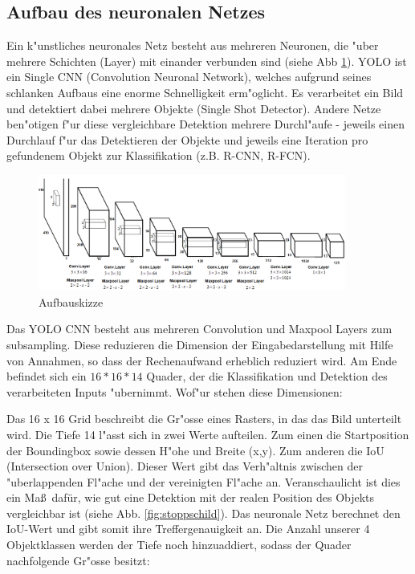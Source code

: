 \subsection{Aufbau des neuronalen Netzes}
\label{sec:cnn_aufbau}
Ein k"unstliches neuronales Netz besteht aus mehreren Neuronen, die "uber mehrere Schichten (Layer) mit einander verbunden sind (siehe Abb \ref{fig:neunet}). YOLO ist ein Single CNN (Convolution Neuronal Network),
welches aufgrund seines schlanken Aufbaus eine enorme Schnelligkeit erm"oglicht. Es verarbeitet ein Bild und detektiert dabei mehrere Objekte (Single Shot Detector). Andere Netze ben"otigen f"ur diese vergleichbare Detektion mehrere Durchl"aufe - jeweils einen Durchlauf f"ur das Detektieren der Objekte und jeweils eine Iteration pro gefundenem Objekt zur Klassifikation (z.B. R-CNN, R-FCN).

\begin{figure}[h]
	\centering
	\includegraphics[width=0.90\textwidth]{images/aufbauskizze}
	\caption{Aufbauskizze}
	\label{fig:neunet}
\end{figure}

Das YOLO CNN besteht aus mehreren Convolution und Maxpool Layers zum subsampling.
Diese reduzieren die Dimension der Eingabedarstellung mit Hilfe von Annahmen,
so dass der Rechenaufwand erheblich reduziert wird. Am Ende befindet sich ein $16*16*14$ Quader, der die Klassifikation und Detektion des verarbeiteten Inputs "ubernimmt. Wof"ur stehen diese Dimensionen:

Das 16 x 16 Grid beschreibt die Gr"osse eines Rasters, in das das Bild unterteilt wird. Die Tiefe 14 l"asst sich in zwei Werte aufteilen. Zum einen die Startposition der Boundingbox sowie dessen H"ohe und Breite (x,y).  Zum anderen die IoU (Intersection over Union). Dieser Wert gibt das Verh"altnis zwischen der "uberlappenden Fl"ache und der vereinigten Fl"ache an. Veranschaulicht ist dies ein Ma\ss \ daf\"ur, wie gut eine Detektion mit der realen Position des Objekts vergleichbar ist (siehe Abb. \ref{fig:stoppschild}). Das neuronale Netz berechnet den IoU-Wert und gibt somit ihre Treffergenauigkeit an. Die Anzahl unserer 4 Objektklassen werden der Tiefe noch hinzuaddiert,
sodass der Quader nachfolgende Gr"osse besitzt:

